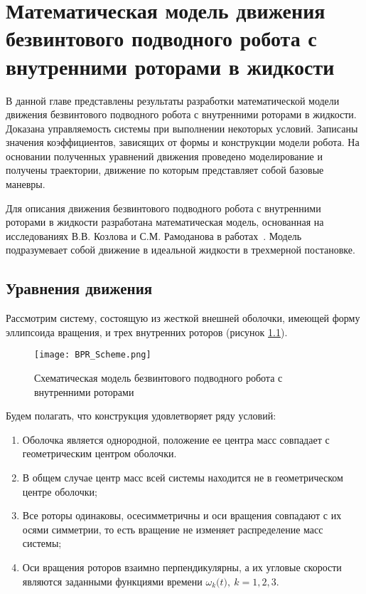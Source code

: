 \chapter{Математическая модель движения безвинтового подводного робота с внутренними роторами в жидкости}\label{ch:ch2}

В данной главе представлены результаты разработки математической модели движения безвинтового подводного робота с внутренними роторами в жидкости. Доказана управляемость системы при выполнении некоторых условий. Записаны значения коэффициентов, зависящих от формы и конструкции модели робота. На основании полученных уравнений движения проведено моделирование и получены траектории, движение по которым представляет собой базовые маневры.

Для описания движения безвинтового подводного робота с внутренними роторами в жидкости разработана математическая модель, основанная на исследованиях В.В. Козлова и С.М. Рамоданова  в работах~\cite{Kozlov_Ramodanov_PMM_2001, Kozlov_Ramodanov_PAN_2002}. Модель подразумевает собой движение в идеальной жидкости в трехмерной постановке.


\section{Уравнения движения}\label{sec:ch2/sec1}

Рассмотрим систему, состоящую из жесткой внешней оболочки, имеющей форму эллипсоида вращения, и трех внутренних роторов (рисунок \ref{rotors}). %

\begin{figure}[th]
	\begin{center}
		\texttt{[image: BPR\_Scheme.png]}
		\caption{Схематическая модель безвинтового подводного робота с внутренними роторами} \label{rotors}
	\end{center}
\end{figure}


Будем полагать, что конструкция удовлетворяет ряду условий:
\begin{enumerate}
	\item Оболочка является однородной, положение ее центра масс совпадает с геометрическим центром оболочки.
	\item В общем случае центр масс всей системы находится не в геометрическом центре оболочки;
	\item Все роторы одинаковы, осесимметричны и оси вращения  совпадают с их осями симметрии, то есть вращение не изменяет распределение масс системы;
	\item Оси вращения роторов взаимно перпендикулярны, а их угловые скорости являются заданными функциями времени $\omega _k \bigl( t \bigr),~k=1,2,3$.
\end{enumerate}

